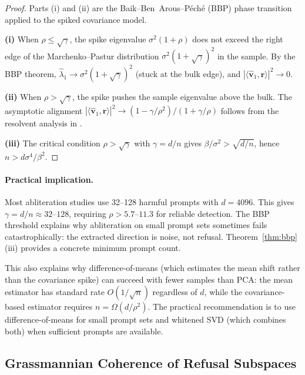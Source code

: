\begin{proof}
Parts (i) and (ii) are the Baik--Ben~Arous--P\'ech\'e (BBP) phase transition \citep{baik2005phase,paul2007asymptotics} applied to the spiked covariance model.

\textbf{(i)} When $\rho \leq \sqrt{\gamma}$, the spike eigenvalue $\sigma^2(1 + \rho)$ does not exceed the right edge of the Marchenko--Pastur distribution $\sigma^2(1+\sqrt{\gamma})^2$ in the sample.
By the BBP theorem, $\hat{\lambda}_1 \to \sigma^2(1+\sqrt{\gamma})^2$ (stuck at the bulk edge), and $|\langle\hat{\mathbf{v}}_1, \mathbf{r}\rangle|^2 \to 0$.

\textbf{(ii)} When $\rho > \sqrt{\gamma}$, the spike pushes the sample eigenvalue above the bulk.
The asymptotic alignment $|\langle\hat{\mathbf{v}}_1, \mathbf{r}\rangle|^2 \to (1 - \gamma/\rho^2)/(1 + \gamma/\rho)$ follows from the resolvent analysis in \citet{paul2007asymptotics}.

\textbf{(iii)} The critical condition $\rho > \sqrt{\gamma}$ with $\gamma = d/n$ gives $\beta/\sigma^2 > \sqrt{d/n}$, hence $n > d\sigma^4/\beta^2$.
\end{proof}

\paragraph{Practical implication.}
Most abliteration studies use 32--128 harmful prompts with $d = 4096$.
This gives $\gamma = d/n \approx 32$--$128$, requiring $\rho > 5.7$--$11.3$ for reliable detection.
The BBP threshold explains why abliteration on small prompt sets sometimes fails catastrophically: the extracted direction is noise, not refusal.
Theorem~\ref{thm:bbp}(iii) provides a concrete minimum prompt count.

This also explains why difference-of-means (which estimates the mean shift rather than the covariance spike) can succeed with fewer samples than PCA: the mean estimator has standard rate $O(1/\sqrt{n})$ regardless of $d$, while the covariance-based estimator requires $n = \Omega(d/\rho^2)$.
The practical recommendation is to use difference-of-means for small prompt sets and whitened SVD (which combines both) when sufficient prompts are available.

\subsection{Grassmannian Coherence of Refusal Subspaces}
\label{app:grassmannian}

